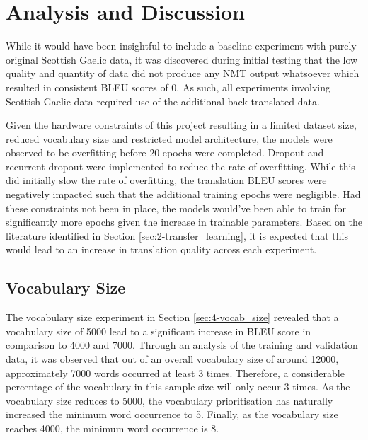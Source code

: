 \chapter{Analysis and Discussion}

While it would have been insightful to include a baseline experiment with purely original Scottish Gaelic data, it was discovered during initial testing that the low quality and quantity of data did not produce any \acrshort{NMT} output whatsoever which resulted in consistent \acrshort{BLEU} scores of 0. As such, all experiments involving Scottish Gaelic data required use of the additional back-translated data.

Given the hardware constraints of this project resulting in a limited dataset size, reduced vocabulary size and restricted model architecture, the models were observed to be overfitting before 20 epochs were completed. Dropout and recurrent dropout were implemented to reduce the rate of overfitting. While this did initially slow the rate of overfitting, the translation \acrshort{BLEU} scores were negatively impacted such that the additional training epochs were negligible. Had these constraints not been in place, the models would've been able to train for significantly more epochs given the increase in trainable parameters. Based on the literature identified in Section \ref{sec:2-transfer_learning}, it is expected that this would lead to an increase in translation quality across each experiment.

\section{Vocabulary Size}
The vocabulary size experiment in Section \ref{sec:4-vocab_size} revealed that a vocabulary size of 5000 lead to a significant increase in \acrshort{BLEU} score in comparison to 4000 and 7000. Through an analysis of the training and validation data, it was observed that out of an overall vocabulary size of around 12000, approximately 7000 words occurred at least 3 times. Therefore, a considerable percentage of the vocabulary in this sample size will only occur 3 times. As the vocabulary size reduces to 5000, the vocabulary prioritisation has naturally increased the minimum word occurrence to 5. Finally, as the vocabulary size reaches 4000, the minimum word occurrence is 8.

